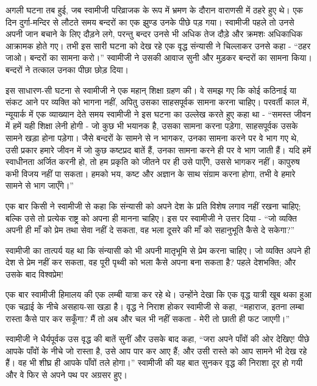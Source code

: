 अगली घटना तब हुई, जब स्वामीजी परिव्राजक के रूप में भ्रमण के दौरान वाराणसी में ठहरे हुए थे। एक दिन दुर्गा-मन्दिर से लौटते समय बन्दरों का एक झुण्ड उनके पीछे पड़ गया। स्वामीजी पहले तो उनसे अपनी जान बचाने के लिए दौड़ने लगे, परन्तु बन्दर उनसे भी अधिक तेज दौड़े और क्रमशः अधिकाधिक आक्रामक होते गए। तभी इस सारी घटना को देख रहे एक वृद्ध संन्यासी ने चिल्लाकर उनसे कहा - “ठहर जाओ। बन्दरों का सामना करो।” स्वामीजी ने उसकी आवाज सुनी और मुड़कर बन्दरों का सामना किया। बन्दरों ने तत्काल उनका पीछा छोड़ दिया। 

इस साधारण-सी घटना से स्वामीजी ने एक महान् शिक्षा ग्रहण की। वे समझ गए कि कोई कठिनाई या संकट आने पर व्यक्ति को भागना नहीं, अपितु उसका साहसपूर्वक सामना करना चाहिए। परवर्ती काल में, न्यूयार्क में एक व्याख्यान देते समय स्वामीजी ने इस घटना का उल्लेख करते हुए कहा था - “समस्त जीवन में हमें यही शिक्षा लेनी होगी - जो कुछ भी भयानक है, उसका सामना करना पड़ेगा, साहसपूर्वक उसके सामने खड़ा होना पड़ेगा। जैसे बन्दरों के सामने से न भागकर, उनका सामना करने पर वे भाग गए थे, उसी प्रकार हमारे जीवन में जो कुछ कष्टप्रद बातें हैं, उनका सामना करने ही पर वे भाग जाती हैं। यदि हमें स्वाधीनता अर्जित करनी हो, तो हम प्रकृति को जीतने पर ही उसे पाएँगे, उससे भागकर नहीं। कापुरुष कभी विजय नहीं पा सकता। हमको भय, कष्ट और अज्ञान के साथ संग्राम करना होगा, तभी वे हमारे सामने से भाग जाएँगे।” 

\vskip -8pt

\delimiter

एक बार किसी ने स्वामीजी से कहा कि संन्यासी को अपने देश के प्रति विशेष लगाव नहीं रखना चाहिए; बल्कि उसे तो प्रत्येक राष्ट्र को अपना ही मानना चाहिए। इस पर स्वामीजी ने उत्तर दिया - “जो व्यक्ति अपनी ही माँ को प्रेम तथा सेवा नहीं दे सकता, वह भला दूसरे की माँ को सहानुभूति कैसे दे सकेगा?” 

स्वामीजी का तात्पर्य यह था कि संन्यासी को भी अपनी मातृभूमि से प्रेम करना चाहिए। जो व्यक्ति अपने ही देश से प्रेम नहीं कर सकता, वह पूरी पृथ्वी को भला कैसे अपना बना सकता है? पहले देशभक्ति; और उसके बाद विश्वप्रेम! 

\vskip -8pt

\delimiter

एक बार स्वामीजी हिमालय की एक लम्बी यात्रा कर रहे थे। उन्होंने देखा कि एक वृद्ध यात्री खूब थका हुआ एक चढ़ाई के नीचे असहाय-सा खड़ा है। वृद्ध ने निराश होकर स्वामीजी से कहा, “महाराज, इतना लम्बा रास्ता कैसे पार कर सकूँगा? मैं तो अब और चल भी नहीं सकता - मेरी तो छाती ही फट जाएगी।” 

स्वामीजी ने धैर्यपूर्वक उस वृद्ध की बातें सुनीं और उसके बाद कहा, “जरा अपने पाँवों की ओर देखिए! पीछे आपके पाँवों के नीचे जो रास्ता है, उसे आप पार कर आए हैं; और उसी रास्ते को आप सामने भी देख रहे हैं। वह भी शीघ्र ही आपके पाँवों तले होगा।” स्वामीजी की यह बात सुनकर वृद्ध की निराशा दूर हो गयी और वे फिर से अपने पथ पर अग्रसर हुए। 


